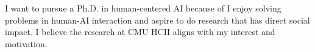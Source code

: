 
I want to pursue a Ph.D. in human-centered AI because of I enjoy solving problems in human-AI interaction and aspire to do research that has direct social impact. 
I believe the research at CMU HCII aligns with my interest and motivation.

